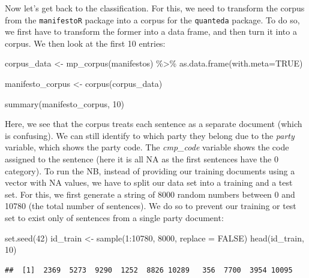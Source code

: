 \documentclass[
]{article}
\newenvironment{Shaded}{\begin{snugshade}}{\end{snugshade}}
\newcommand{\AttributeTok}[1]{\textcolor[rgb]{0.77,0.63,0.00}{#1}}
\newcommand{\ConstantTok}[1]{\textcolor[rgb]{0.00,0.00,0.00}{#1}}
\newcommand{\DecValTok}[1]{\textcolor[rgb]{0.00,0.00,0.81}{#1}}
\newcommand{\FunctionTok}[1]{\textcolor[rgb]{0.00,0.00,0.00}{#1}}
\newcommand{\NormalTok}[1]{#1}
\newcommand{\OtherTok}[1]{\textcolor[rgb]{0.56,0.35,0.01}{#1}}
\newcommand{\SpecialCharTok}[1]{\textcolor[rgb]{0.00,0.00,0.00}{#1}}
\begin{document}
Now let's get back to the classification. For this, we need to transform the corpus from the \texttt{manifestoR} package into a corpus for the \texttt{quanteda} package. To do so, we first have to transform the former into a data frame, and then turn it into a corpus. We then look at the first 10 entries:

\begin{Shaded}
\begin{Highlighting}[]
\NormalTok{corpus\_data }\OtherTok{\textless{}{-}} \FunctionTok{mp\_corpus}\NormalTok{(manifestos) }\SpecialCharTok{\%\textgreater{}\%} 
 \FunctionTok{as.data.frame}\NormalTok{(}\AttributeTok{with.meta=}\ConstantTok{TRUE}\NormalTok{)}

\NormalTok{manifesto\_corpus }\OtherTok{\textless{}{-}} \FunctionTok{corpus}\NormalTok{(corpus\_data)}

\FunctionTok{summary}\NormalTok{(manifesto\_corpus, }\DecValTok{10}\NormalTok{)}
\end{Highlighting}
\end{Shaded}

Here, we see that the corpus treats each sentence as a separate document (which is confusing). We can still identify to which party they belong due to the \emph{party} variable, which shows the party code. The \emph{cmp\_code} variable shows the code assigned to the sentence (here it is all NA as the first sentences have the 0 category). To run the NB, instead of providing our training documents using a vector with NA values, we have to split our data set into a training and a test set. For this, we first generate a string of 8000 random numbers between 0 and 10780 (the total number of sentences). We do so to prevent our training or test set to exist only of sentences from a single party document:

\begin{Shaded}
\begin{Highlighting}[]
\FunctionTok{set.seed}\NormalTok{(}\DecValTok{42}\NormalTok{)}
\NormalTok{id\_train }\OtherTok{\textless{}{-}} \FunctionTok{sample}\NormalTok{(}\DecValTok{1}\SpecialCharTok{:}\DecValTok{10780}\NormalTok{, }\DecValTok{8000}\NormalTok{, }\AttributeTok{replace =} \ConstantTok{FALSE}\NormalTok{)}
\FunctionTok{head}\NormalTok{(id\_train, }\DecValTok{10}\NormalTok{)}
\end{Highlighting}
\end{Shaded}

\begin{verbatim}
##  [1]  2369  5273  9290  1252  8826 10289   356  7700  3954 10095
\end{verbatim}
\end{document}
